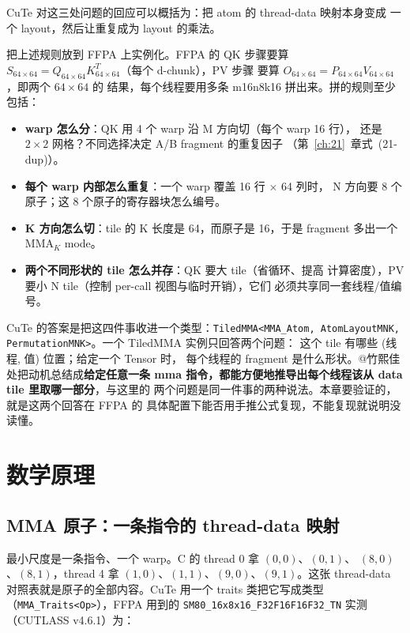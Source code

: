 CuTe 对这三处问题的回应可以概括为：把 atom 的 thread-data 映射本身变成
一个 layout，然后让重复成为 layout 的乘法。

把上述规则放到 FFPA 上实例化。FFPA 的 QK 步骤要算
$S_{64\times64} = Q_{64\times64} K^T_{64\times64}$（每个 d-chunk），PV 步骤
要算 $O_{64\times64} = P_{64\times64} V_{64\times64}$，即两个 $64\times64$ 的
结果，每个线程要用多条 m16n8k16 拼出来。拼的规则至少包括：

\begin{itemize}
  \item \textbf{warp 怎么分}：QK 用 4 个 warp 沿 M 方向切（每个 warp 16 行），
        还是 $2\times2$ 网格？不同选择决定 A/B fragment 的重复因子
        （第~\ref{ch:21}~章式~(21-dup)）。
  \item \textbf{每个 warp 内部怎么重复}：一个 warp 覆盖 16 行 $\times$ 64 列时，
        N 方向要 8 个原子；这 8 个原子的寄存器块怎么编号。
  \item \textbf{K 方向怎么切}：tile 的 K 长度是 64，而原子是 16，于是 fragment
        多出一个 $\mathrm{MMA}_K$ mode。
  \item \textbf{两个不同形状的 tile 怎么并存}：QK 要大 tile（省循环、提高
        计算密度），PV 要小 N tile（控制 per-call 视图与临时开销），它们
        必须共享同一套线程/值编号。
\end{itemize}

CuTe 的答案是把这四件事收进一个类型：\texttt{Tiled\allowbreak{}MMA\allowbreak{}<MMA\_\allowbreak{}Atom,\allowbreak{}
Atom\allowbreak{}Layout\allowbreak{}MNK,\allowbreak{} Permutation\allowbreak{}MNK>}。一个 TiledMMA 实例只回答两个问题：
这个 tile 有哪些 (线程, 值) 位置；给定一个 Tensor 时，
每个线程的 fragment 是什么形状。@竹熙佳处把动机总结成\textbf{给定任意一条
mma 指令，都能方便地推导出每个线程该从 data tile 里取哪一部分}，与这里的
两个问题是同一件事的两种说法。本章要验证的，就是这两个回答在 FFPA 的
具体配置下能否用手推公式复现，不能复现就说明没读懂。

\section{数学原理}

\subsection{MMA 原子：一条指令的 thread-data 映射}

最小尺度是一条指令、一个 warp。C 的 thread 0 拿 $(0,0)$、$(0,1)$、
$(8,0)$、$(8,1)$，thread 4 拿 $(1,0)$、$(1,1)$、$(9,0)$、$(9,1)$。这张
thread-data 对照表就是原子的全部内容。CuTe 用一个 traits 类把它写成类型
（\texttt{MMA\_\allowbreak{}Traits\allowbreak{}<Op>}），FFPA 用到的
\texttt{SM80\_\allowbreak{}16x8x16\_\allowbreak{}F32\allowbreak{}F16\allowbreak{}F16\allowbreak{}F32\_\allowbreak{}TN} 实测（CUTLASS v4.6.1）为：


